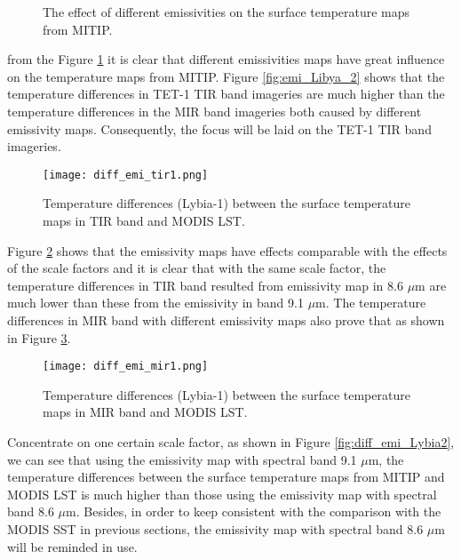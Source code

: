 \begin{figure}[!htbp]
\centering
{}
\hspace{0.5in}
\caption{The effect of different emissivities on the surface temperature maps from MITIP.}
\label{fig:diff_emi_Lybia}
\end{figure}

\noindent from the Figure \ref{fig:diff_emi_Lybia} it is clear that different emissivities maps have great influence on the temperature maps from MITIP.  Figure \ref{fig:emi_Libya_2} shows that the temperature differences in TET-1 TIR band imageries are much higher than the temperature differences in the MIR band imageries both caused by different emissivity maps. Consequently, the focus will be laid on the TET-1 TIR band imageries.\\

\begin{figure}[!htbp]
\centering
\texttt{[image: diff\_emi\_tir1.png]}
\caption{Temperature differences (Lybia-1) between the surface temperature maps in TIR band and MODIS LST.}
\label{fig:diff_emi_tir1}
\end{figure}

\noindent Figure \ref{fig:diff_emi_tir1} shows that the emissivity maps have effects comparable with the effects of the scale factors and it is clear that with the same scale factor, the temperature differences in TIR band resulted from emissivity map in 8.6 $\mu$m are much lower than these from the emissivity in band 9.1 $\mu$m. The temperature differences in MIR band with different emissivity maps also prove that as shown in Figure \ref{fig:diff_emi_mir1}.\\

\begin{figure}[!htbp]
\centering
\texttt{[image: diff\_emi\_mir1.png]}
\caption{Temperature differences (Lybia-1) between the surface temperature maps in MIR band and MODIS LST.}
\label{fig:diff_emi_mir1}
\end{figure}

\noindent Concentrate on one certain scale factor, as shown in Figure \ref{fig:diff_emi_Lybia2}, we can see that using the emissivity map with spectral band 9.1 $\mu$m, the temperature differences between the surface temperature maps from MITIP and MODIS LST is much higher than those using the emissivity map with spectral band 8.6 $\mu$m. Besides, in order to keep consistent with the comparison with the MODIS SST in previous sections, the emissivity map with spectral band 8.6 $\mu$m will be reminded in use.\\

